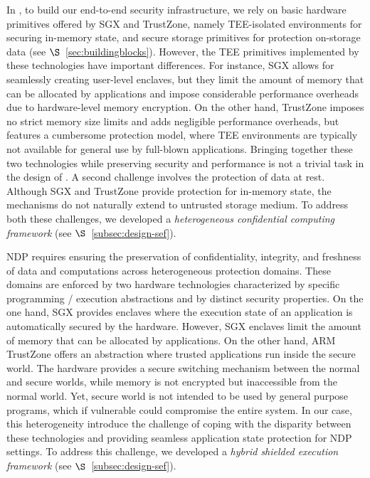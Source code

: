  In \project{}, to build our end-to-end security infrastructure, we rely on basic hardware primitives offered by SGX and TrustZone, namely TEE-isolated environments for securing in-memory state, and secure storage primitives for protection on-storage data (see $\S$~\ref{sec:buildingblocks}). However, the TEE primitives implemented by these technologies have important differences. For instance, SGX allows for seamlessly creating user-level enclaves, but they limit the amount of memory that can be allocated by applications and impose considerable performance overheads due to hardware-level memory encryption. On the other hand, TrustZone imposes no strict memory size limits and adds negligible performance overheads, but features a cumbersome protection model, where TEE environments are typically not available for general use by full-blown applications. Bringing together these two technologies while preserving security and performance is not a trivial task in the design of \project{}. A second challenge involves the protection of data at rest. Although SGX and TrustZone provide protection for in-memory state, the mechanisms do not naturally extend to untrusted storage medium. %
To address both these challenges, we developed a \textit{heterogeneous confidential computing framework} (see $\S$~\ref{subsec:design-sef}).

 NDP requires ensuring the preservation of confidentiality, integrity, and freshness of data and computations across heterogeneous protection domains. These domains are enforced by two hardware technologies characterized by specific programming / execution abstractions and by distinct security properties. On the one hand, SGX provides enclaves where the execution state of an application is automatically secured by the hardware. However, SGX enclaves limit the amount of memory that can be allocated by applications.
On the other hand, ARM TrustZone offers an abstraction where trusted applications run inside the secure world. The hardware provides a secure switching mechanism between the normal and secure worlds, %
while memory is not encrypted but inaccessible from the normal world.
Yet, secure world is not intended to be used by general purpose programs, which if vulnerable could compromise the entire system.
In our case, this heterogeneity introduce the challenge of coping with the disparity between these technologies and providing seamless application state protection for NDP settings. To address this challenge, we developed a \textit{hybrid shielded execution framework} (see $\S$~\ref{subsec:design-sef}).

